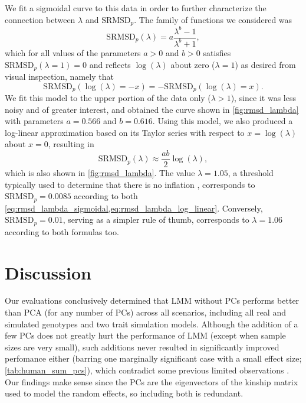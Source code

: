 \documentclass[11pt]{article}
\newcommand{\rmsd}{\text{SRMSD}_p}
\begin{document}
We fit a sigmoidal curve to this data in order to further characterize the connection between $\lambda$ and $\rmsd$.
The family of functions we considered was
\begin{equation}
  \label{eq:rmsd_lambda_sigmoidal}
  \rmsd( \lambda ) = a \frac{ \lambda^b - 1 }{ \lambda^b + 1 },
\end{equation}
which for all values of the parameters $a > 0$ and $b > 0$ satisfies $\rmsd( \lambda = 1 ) = 0$ and reflects $\log( \lambda )$ about zero ($\lambda = 1$) as desired from visual inspection, namely that
$$
\rmsd( \log( \lambda ) = -x ) = - \rmsd( \log( \lambda ) = x ).
$$
We fit this model to the upper portion of the data only ($\lambda > 1$), since it was less noisy and of greater interest, and obtained the curve shown in \cref{fig:rmsd_lambda} with parameters $a = 0.566$ and $b = 0.616$.
Using this model, we also produced a log-linear approximation based on its Taylor series with respect to $x = \log( \lambda )$ about $x=0$, resulting in
\begin{equation}
  \label{eq:rmsd_lambda_log_linear}
  \rmsd( \lambda ) \approx \frac{a b}{2} \log( \lambda ),
\end{equation}
which is also shown in \cref{fig:rmsd_lambda}.
The value $\lambda = 1.05$, a threshold typically used to determine that there is no inflation \citep{price_new_2010}, corresponds to $\rmsd = 0.0085$ according to both \cref{eq:rmsd_lambda_sigmoidal,eq:rmsd_lambda_log_linear}.
Conversely, $\rmsd = 0.01$, serving as a simpler rule of thumb, corresponds to $\lambda = 1.06$ according to both formulas too.


\section{Discussion}

Our evaluations conclusively determined that LMM without PCs performs better than PCA (for any number of PCs) across all scenarios, including all real and simulated genotypes and two trait simulation models.
Although the addition of a few PCs does not greatly hurt the performance of LMM (except when sample sizes are very small), such additions never resulted in significantly improved perfomance either (barring one marginally significant case with a small effect size; \cref{tab:human_sum_pcs}), which contradict some previous limited observations \citep{zhao_arabidopsis_2007, price_new_2010}.
Our findings make sense since the PCs are the eigenvectors of the kinship matrix used to model the random effects, so including both is redundant.
\end{document}
